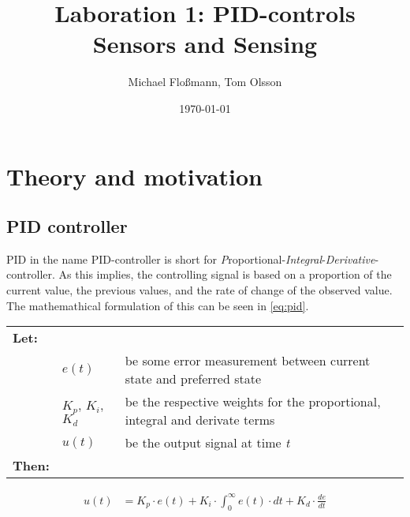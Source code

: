 \documentclass[11pt]{article}
\title{Laboration 1: PID-controls\\ {\small Sensors and Sensing}}
\author{Michael Flo{\ss}mann, Tom Olsson}
\date{\today}
\begin{document}
\maketitle %
\listoffigures %
\lstlistoflistings %
\lstset{ matchrangestart=t} %
\section{Theory and motivation}
\subsection{PID controller}
PID in the name PID-controller is short for \emph{P}roportional-\emph{Integral}-\emph{Derivative}-controller. As this implies, the controlling signal is based on a proportion of the current value, the previous values, and the rate of change of the observed value. The mathemathical formulation of this can be seen in \vref{eq:pid}.\par \vspace{10pt}
{\footnotesize
  \begin{tabular}{l l l}
    \textbf{Let:} \\
 &$e(t)$ &be some error measurement between current state and preferred state\\
 &$K_p$, $K_i$, $K_d$ &be the respective weights for the proportional, integral and derivate terms \\
 &$u(t)$ &be the output signal at time \emph{t} \\
    \textbf{Then:}
  \end{tabular}
  \begin{align}
    u(t) &= K_p\cdot e(t) + K_i \cdot\int_{0}^{\infty}e(t)\cdot dt + K_d \cdot \frac{de}{dt}\label{eq:pid}
  \end{align}}
\par
\end{document}
